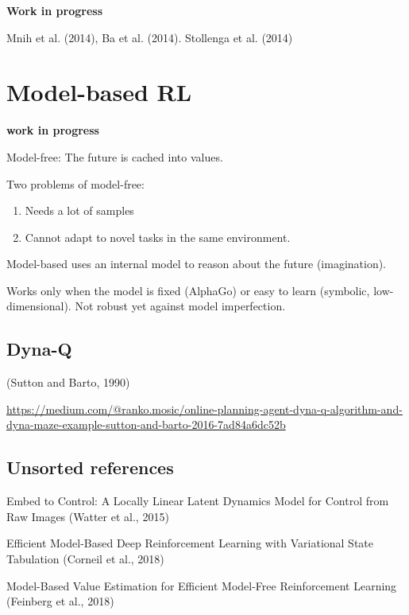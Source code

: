 \documentclass[
  letterpaper,
  DIV=11,
  numbers=noendperiod]{scrreprt}
\providecommand{\tightlist}{%
  \setlength{\itemsep}{0pt}\setlength{\parskip}{0pt}}\usepackage{longtable,booktabs,array}
\begin{document}
\textbf{Work in progress}

Mnih et al. (2014), Ba et al. (2014). Stollenga et al. (2014)


\hypertarget{model-based-rl}{%
\chapter{Model-based RL}\label{model-based-rl}}

\textbf{work in progress}

Model-free: The future is cached into values.

Two problems of model-free:

\begin{enumerate}
\def\labelenumi{\arabic{enumi}.}
\tightlist
\item
  Needs a lot of samples
\item
  Cannot adapt to novel tasks in the same environment.
\end{enumerate}

Model-based uses an internal model to reason about the future
(imagination).

Works only when the model is fixed (AlphaGo) or easy to learn (symbolic,
low-dimensional). Not robust yet against model imperfection.

\hypertarget{dyna-q}{%
\section{Dyna-Q}\label{dyna-q}}

(Sutton and Barto, 1990)

\url{https://medium.com/@ranko.mosic/online-planning-agent-dyna-q-algorithm-and-dyna-maze-example-sutton-and-barto-2016-7ad84a6dc52b}

\hypertarget{unsorted-references}{%
\section{Unsorted references}\label{unsorted-references}}

Embed to Control: A Locally Linear Latent Dynamics Model for Control
from Raw Images (Watter et al., 2015)

Efficient Model-Based Deep Reinforcement Learning with Variational State
Tabulation (Corneil et al., 2018)

Model-Based Value Estimation for Efficient Model-Free Reinforcement
Learning (Feinberg et al., 2018)
\end{document}
